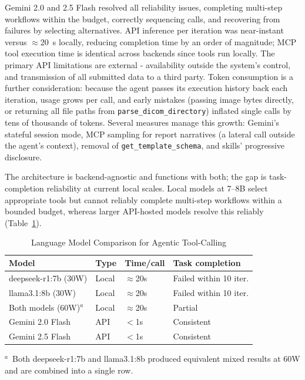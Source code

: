 \documentclass[conference]{IEEEtran}
\begin{document}
Gemini 2.0 and 2.5 Flash resolved all reliability issues, completing multi-step workflows within the budget, correctly sequencing calls, and recovering from failures by selecting alternatives. API inference per iteration was near-instant versus $\approx$20~s locally, reducing completion time by an order of magnitude; MCP tool execution time is identical across backends since tools run locally. The primary API limitations are external - availability outside the system's control, and transmission of all submitted data to a third party. Token consumption is a further consideration: because the agent passes its execution history back each iteration, usage grows per call, and early mistakes (passing image bytes directly, or returning all file paths from \texttt{parse\_dicom\_directory}) inflated single calls by tens of thousands of tokens. Several measures manage this growth: Gemini's stateful session mode, MCP sampling for report narratives (a lateral call outside the agent's context), removal of \texttt{get\_template\_schema}, and skills' progressive disclosure.

The architecture is backend-agnostic and functions with both; the gap is task-completion reliability at current local scales. Local models at 7--8B select appropriate tools but cannot reliably complete multi-step workflows within a bounded budget, whereas larger API-hosted models resolve this reliably (Table~\ref{tab:model-comparison}).

\begin{table}[t]
  \caption{Language Model Comparison for Agentic Tool-Calling}
  \label{tab:model-comparison}
  \centering
  \begin{tabular}{llll}
    \toprule
    Model & Type & Time/call & Task completion \\
    \midrule
    deepseek-r1:7b (30W) & Local & $\approx$20s & Failed within 10 iter. \\
    llama3.1:8b (30W)    & Local & $\approx$20s & Failed within 10 iter. \\
    Both models (60W)$^{a}$ & Local & $\approx$20s & Partial \\
    Gemini 2.0 Flash     & API   & $<$1s        & Consistent \\
    Gemini 2.5 Flash     & API   & $<$1s        & Consistent \\
    \bottomrule
  \end{tabular}
  \par\smallskip
  \raggedright\footnotesize
  $^{a}$~Both deepseek-r1:7b and llama3.1:8b produced equivalent mixed results at 60W and are combined into a single row.
\end{table}
\end{document}
